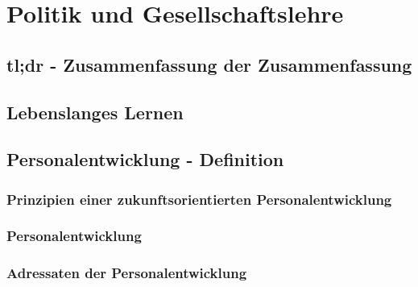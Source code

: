 \section{Politik und Gesellschaftslehre}

\subsection{tl;dr - Zusammenfassung der Zusammenfassung}

\subsection{Lebenslanges Lernen}


\subsection{Personalentwicklung - Definition}

\subsubsection{Prinzipien einer zukunftsorientierten Personalentwicklung}

\subsubsection{Personalentwicklung}

\subsubsection{Adressaten der Personalentwicklung}

